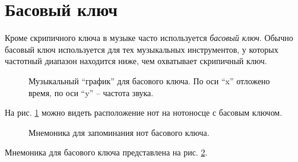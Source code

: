 \documentclass[../sparc.tex]{subfiles}
\begin{document}
\newpage
\section{Басовый ключ}

Кроме скрипичного ключа в музыке часто используется \emph{басовый ключ}.  Обычно
басовый ключ используется для тех музыкальных инструментов, у которых частотный
диапазон находится ниже, чем охватывает скрипичный ключ.

\begin{figure}[ht]
  \centering
  \caption{Музыкальный ``график'' для басового ключа.  По оси ``x'' отложено
    время, по оси ``y'' -- частота звука.}
  \label{fig:lilypond-bass-clef}
\end{figure}


На рис. \ref{fig:lilypond-bass-clef} можно видеть расположение нот на нотоносце
с басовым ключом.

\begin{figure}[ht]
  \centering
  \caption{Мнемоника для запоминания нот басового ключа.}
  \label{fig:lilypond-bass-clef-mnemonic}
\end{figure}

Мнемоника для басового ключа представлена на
рис. \ref{fig:lilypond-bass-clef-mnemonic}.
\end{document}
